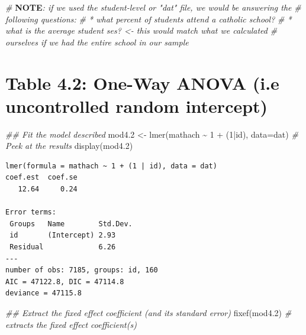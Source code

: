 \documentclass[
  letterpaper,
  DIV=11,
  numbers=noendperiod]{scrreprt}
\newenvironment{Shaded}{}{}
\newcommand{\AlertTok}[1]{\textcolor[rgb]{1.00,0.00,0.00}{\textbf{#1}}}
\newcommand{\AttributeTok}[1]{\textcolor[rgb]{0.49,0.56,0.16}{#1}}
\newcommand{\CommentTok}[1]{\textcolor[rgb]{0.38,0.63,0.69}{\textit{#1}}}
\newcommand{\DecValTok}[1]{\textcolor[rgb]{0.25,0.63,0.44}{#1}}
\newcommand{\DocumentationTok}[1]{\textcolor[rgb]{0.73,0.13,0.13}{\textit{#1}}}
\newcommand{\FloatTok}[1]{\textcolor[rgb]{0.25,0.63,0.44}{#1}}
\newcommand{\FunctionTok}[1]{\textcolor[rgb]{0.02,0.16,0.49}{#1}}
\newcommand{\NormalTok}[1]{#1}
\newcommand{\OtherTok}[1]{\textcolor[rgb]{0.00,0.44,0.13}{#1}}
\newcommand{\SpecialCharTok}[1]{\textcolor[rgb]{0.25,0.44,0.63}{#1}}
\begin{document}
\begin{Shaded}
\begin{Highlighting}[]
\CommentTok{\# }\AlertTok{NOTE}\CommentTok{: if we used the student{-}level or "dat" file, we would be answering the}
\CommentTok{\# following questions:}
\CommentTok{\# * what percent of students attend a catholic school?}
\CommentTok{\# * what is the average student ses? \textless{}{-} this would match what we calculated}
\CommentTok{\# ourselves if we had the entire school in our sample}
\end{Highlighting}
\end{Shaded}

\section{Table 4.2: One-Way ANOVA (i.e uncontrolled random
intercept)}\label{table-4.2-one-way-anova-i.e-uncontrolled-random-intercept}

\begin{Shaded}
\begin{Highlighting}[]
\DocumentationTok{\#\# Fit the model described }
\NormalTok{mod4}\FloatTok{.2} \OtherTok{\textless{}{-}} \FunctionTok{lmer}\NormalTok{(mathach }\SpecialCharTok{\textasciitilde{}} \DecValTok{1} \SpecialCharTok{+}\NormalTok{ (}\DecValTok{1}\SpecialCharTok{|}\NormalTok{id), }\AttributeTok{data=}\NormalTok{dat)}
\CommentTok{\# Peek at the results}
\FunctionTok{display}\NormalTok{(mod4}\FloatTok{.2}\NormalTok{)}
\end{Highlighting}
\end{Shaded}

\begin{verbatim}
lmer(formula = mathach ~ 1 + (1 | id), data = dat)
coef.est  coef.se 
   12.64     0.24 

Error terms:
 Groups   Name        Std.Dev.
 id       (Intercept) 2.93    
 Residual             6.26    
---
number of obs: 7185, groups: id, 160
AIC = 47122.8, DIC = 47114.8
deviance = 47115.8 
\end{verbatim}

\begin{Shaded}
\begin{Highlighting}[]
\DocumentationTok{\#\# Extract the fixed effect coefficient (and it\textquotesingle{}s standard error)}
\FunctionTok{fixef}\NormalTok{(mod4}\FloatTok{.2}\NormalTok{) }\CommentTok{\# extracts the fixed effect coefficient(s)}
\end{Highlighting}
\end{Shaded}
\end{document}

